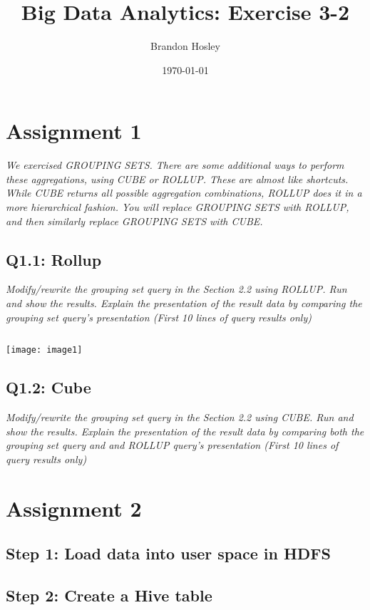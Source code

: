 \documentclass[]{article}
\title{Big Data Analytics: Exercise 3-2}
\author{Brandon Hosley}
\date{\today}
\begin{document}
\maketitle

\section*{Assignment 1}
\emph{We exercised GROUPING SETS. There are some additional ways to perform these aggregations, using CUBE or ROLLUP. These are almost like shortcuts. While CUBE returns all possible aggregation combinations, ROLLUP does it in a more hierarchical fashion. You will replace GROUPING SETS with ROLLUP, and then similarly replace GROUPING SETS with CUBE.}

\subsection*{Q1.1: Rollup} 
\emph{Modify/rewrite the grouping set query in the Section 2.2 using ROLLUP. Run and show the results. Explain the presentation of the result data by comparing the grouping set query’s presentation
(First 10 lines of query results only)}

\begin{verbatim}
\end{verbatim}
\texttt{[image: image1]} %

\subsection*{Q1.2: Cube} 
\emph{Modify/rewrite the grouping set query in the Section 2.2 using CUBE. Run and show the results. Explain the presentation of the result data by comparing both the grouping set query and and ROLLUP query’s presentation
(First 10 lines of query results only)}

\section*{Assignment 2}

\subsection*{Step 1: Load data into user space in HDFS} 
\subsection*{Step 2: Create a Hive table}
\end{document}
